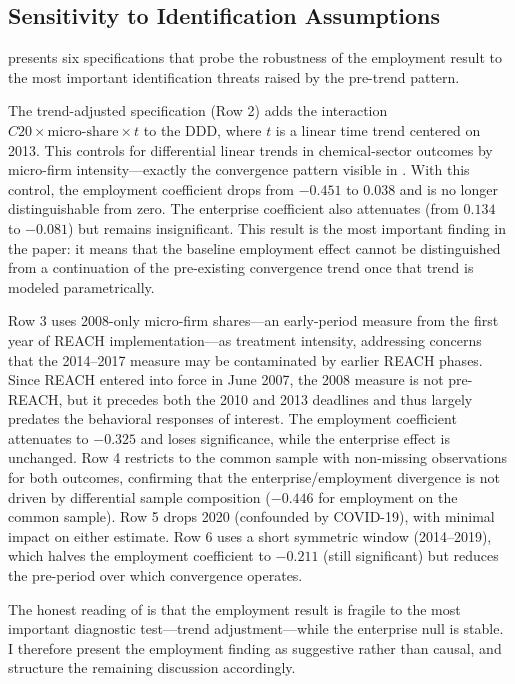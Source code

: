 \documentclass[12pt]{article}
\begin{document}
\subsection{Sensitivity to Identification Assumptions}

 presents six specifications that probe the robustness of the employment result to the most important identification threats raised by the pre-trend pattern.



The trend-adjusted specification (Row 2) adds the interaction $C20 \times \text{micro-share} \times t$ to the DDD, where $t$ is a linear time trend centered on 2013. This controls for differential linear trends in chemical-sector outcomes by micro-firm intensity---exactly the convergence pattern visible in . With this control, the employment coefficient drops from $-0.451$ to $0.038$ and is no longer distinguishable from zero. The enterprise coefficient also attenuates (from $0.134$ to $-0.081$) but remains insignificant. This result is the most important finding in the paper: it means that the baseline employment effect cannot be distinguished from a continuation of the pre-existing convergence trend once that trend is modeled parametrically.

Row 3 uses 2008-only micro-firm shares---an early-period measure from the first year of REACH implementation---as treatment intensity, addressing concerns that the 2014--2017 measure may be contaminated by earlier REACH phases. Since REACH entered into force in June 2007, the 2008 measure is not pre-REACH, but it precedes both the 2010 and 2013 deadlines and thus largely predates the behavioral responses of interest. The employment coefficient attenuates to $-0.325$ and loses significance, while the enterprise effect is unchanged. Row 4 restricts to the common sample with non-missing observations for both outcomes, confirming that the enterprise/employment divergence is not driven by differential sample composition ($-0.446$ for employment on the common sample). Row 5 drops 2020 (confounded by COVID-19), with minimal impact on either estimate. Row 6 uses a short symmetric window (2014--2019), which halves the employment coefficient to $-0.211$ (still significant) but reduces the pre-period over which convergence operates.

The honest reading of  is that the employment result is fragile to the most important diagnostic test---trend adjustment---while the enterprise null is stable. I therefore present the employment finding as suggestive rather than causal, and structure the remaining discussion accordingly.
\end{document}
